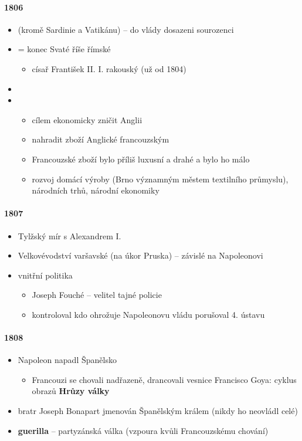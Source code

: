 \paragraph{1806}
\begin{itemize}
\item {} (kromě Sardinie a Vatikánu) -- do vlády dosazeni sourozenci
\item {} = konec Svaté říše římské
	\begin{itemize}
	\item císař František II. \ra I. rakouský (už od 1804)
	\end{itemize}
\item {}
\item {}
	\begin{itemize}
	\item cílem ekonomicky zničit Anglii 
	\item nahradit zboží Anglické francouzským
	\item Francouzské zboží bylo příliš luxusní a drahé a bylo ho málo
	\item[\ra] rozvoj domácí výroby (Brno významným městem textilního průmyslu), národních trhů, národní ekonomiky
	\end{itemize}
\end{itemize}

\paragraph{1807}
\begin{itemize}
\item Tylžský mír s Alexandrem I.
\item Velkovévodství varšavské (na úkor Pruska) -- závislé na Napoleonovi
\item vnitřní politika
	\begin{itemize}
	\item Joseph Fouché -- velitel tajné policie
	\item kontroloval kdo ohrožuje Napoleonovu vládu \ra porušoval 4. ústavu
	\end{itemize}
\end{itemize}

\paragraph{1808}
\begin{itemize}
\item Napoleon napadl Španělsko
	\begin{itemize}
	\item Francouzi se chovali nadřazeně, drancovali vesnice \ra Francisco Goya: cyklus obrazů \textbf{Hrůzy války}
	\end{itemize}
\item bratr Joseph Bonapart jmenován Španělským králem (nikdy ho neovládl celé)
\item \textbf{guerilla} -- partyzánská válka (vzpoura kvůli Francouzskému chování)
\end{itemize}

